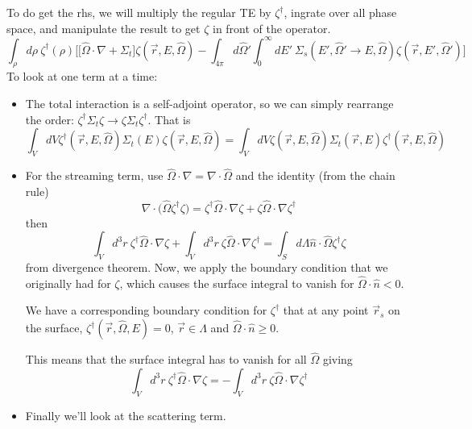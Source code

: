 \documentclass[12pt]{article}
\newcommand{\rvec}{\ensuremath{\vec{r}}}
\newcommand{\vOmega}{\ensuremath{\hat{\Omega}}}
\begin{document}
To do get the rhs, we will multiply the regular TE by $\zeta^{\dagger}$, ingrate over all phase space, and manipulate the result to get $\zeta$ in front of the operator.
%
\[\int_{\rho} d\rho\: \zeta^{\dagger}(\rho)\biggl[ \bigl[\vOmega \cdot \nabla + \Sigma_t\bigr] \zeta(\vec{r}, E, \vOmega) - \int_{4 \pi} d\vOmega' \int_0^{\infty} dE' \: \Sigma_s(E', \vOmega' \rightarrow E, \vOmega) \zeta(\vec{r}, E', \vOmega') \biggr]\]
% 
To look at one term at a time:
\begin{itemize}
\item The total interaction is a self-adjoint operator, so we can simply rearrange the order: $\zeta^{\dagger} \Sigma_t \zeta \rightarrow \zeta \Sigma_t \zeta^{\dagger}$. That is
\[\int_V dV \zeta^{\dagger}(\vec{r}, E, \vOmega) \Sigma_t(E) \zeta(\vec{r}, E, \vOmega) = \int_V dV \zeta(\vec{r}, E, \vOmega) \Sigma_t(\rvec,E) \zeta^{\dagger}(\vec{r}, E, \vOmega)\]
%
\item For the streaming term, use $\vOmega \cdot \nabla = \nabla \cdot \vOmega$ and the identity (from the chain rule)
\[\nabla \cdot \bigl(\vOmega \zeta^{\dagger} \zeta \bigr) = \zeta^{\dagger}\vOmega \cdot \nabla \zeta + \zeta \vOmega \cdot \nabla \zeta^{\dagger}\]
then
\[
\int_V d^3r \:\zeta^{\dagger}\vOmega \cdot \nabla \zeta + \int_V d^3r \:\zeta \vOmega \cdot \nabla \zeta^{\dagger} = \int_S d \Lambda \hat{n} \cdot \vOmega \zeta^{\dagger} \zeta
\]
from divergence theorem. Now, we apply the boundary condition that we originally had for $\zeta$, which causes the surface integral to vanish for $\vOmega \cdot \hat{n} < 0$.

We have a corresponding boundary condition for $\zeta^{\dagger}$ that at any point $\rvec_s$ on the surface, $\zeta^{\dagger}(\rvec, \vOmega, E) = 0$, $\vec{r} \in \Lambda$ and $\vOmega \cdot \hat{n} \geq 0$.

This means that the surface integral has to vanish for all $\vOmega$ giving
\[
\int_V d^3r \:\zeta^{\dagger}\vOmega \cdot \nabla \zeta = -\int_V d^3r \:\zeta \vOmega \cdot \nabla \zeta^{\dagger}
\]
%
\item Finally we'll look at the scattering term. 
\end{itemize}
\end{document}
